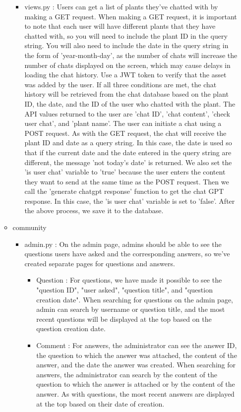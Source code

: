 \documentclass[conference, a4paper]{IEEEtran}
\begin{document}
\begin{enumerate}
\begin{itemize}
\begin{itemize}
        \item views.py : Users can get a list of plants they've chatted with by making a GET request. When making a GET request, it is important to note that each user will have different plants that they have chatted with, so you will need to include the plant ID in the query string. You will also need to include the date in the query string in the form of 'year-month-day', as the number of chats will increase the number of chats displayed on the screen, which may cause delays in loading the chat history. Use a JWT token to verify that the asset was added by the user. If all three conditions are met, the chat history will be retrieved from the chat database based on the plant ID, the date, and the ID of the user who chatted with the plant. The API values returned to the user are 'chat ID', 'chat content', 'check user chat', and 'plant name'. The user can initiate a chat using a POST request. As with the GET request, the chat will receive the plant ID and date as a query string. In this case, the date is used so that if the current date and the date entered in the query string are different, the message 'not today's date' is returned. We also set the 'is user chat' variable to 'true' because the user enters the content they want to send at the same time as the POST request. Then we call the 'generate chatgpt response' function to get the chat GPT response. In this case, the 'is user chat' variable is set to 'false'. After the above process, we save it to the database.
    \end{itemize}

    \item community
    \begin{itemize}
        \item admin.py : On the admin page, admins should be able to see the questions users have asked and the corresponding answers, so we've created separate pages for questions and answers.
        \begin{itemize}
            \item Question : For questions, we have made it possible to see the "question ID", "user asked", "question title", and "question creation date". When searching for questions on the admin page, admin can search by username or question title, and the most recent questions will be displayed at the top based on the question creation date. \\
            \item Comment : For answers, the administrator can see the answer ID, the question to which the answer was attached, the content of the answer, and the date the answer was created. When searching for answers, the administrator can search by the content of the question to which the answer is attached or by the content of the answer. As with questions, the most recent answers are displayed at the top based on their date of creation. \\
        \end{itemize}


\end{itemize}
\end{itemize}
\end{enumerate}
\end{document}
